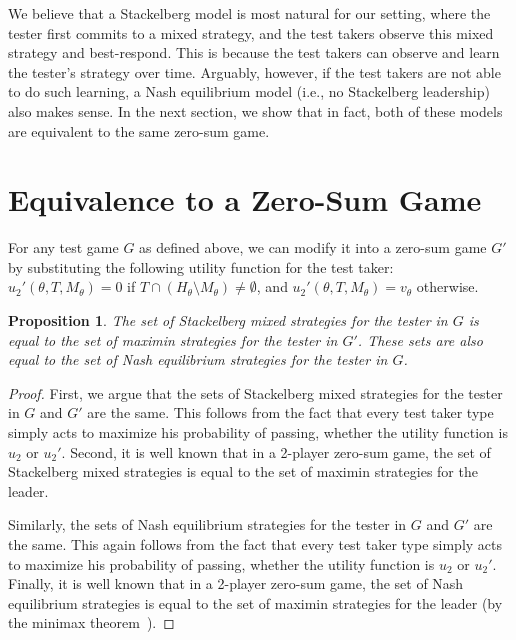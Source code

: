 \documentclass{article}
\newtheorem{proposition}{Proposition}
\begin{document}


We believe that a Stackelberg model is most natural for our setting, where
the tester first commits to a mixed strategy, and the test takers observe
this mixed strategy and best-respond.  This is because the test takers can
observe and learn the tester's strategy over time.  Arguably, however, if
the test takers are not able to do such learning, a Nash equilibrium model
(i.e., no Stackelberg leadership) also makes sense.  In the next section,
we show that in fact, both of these models are equivalent to the same
zero-sum game.





\section{Equivalence to a Zero-Sum Game}

For any test game $G$ as defined above, we can modify it into a zero-sum
game $G'$ by substituting the following utility function for the test
taker: $u_2'(\theta, T, M_\theta) = 0$ if $T \cap (H_\theta \setminus
M_\theta) \neq \emptyset$, and $u_2'(\theta, T, M_\theta) = v_\theta$
otherwise.

\begin{proposition}
  The set of Stackelberg mixed strategies for the tester in $G$ is equal to
  the set of maximin strategies for the tester in $G'$.  These sets are
  also equal to the set of Nash equilibrium strategies for the tester in
  $G$.
\label{prop:equivalence}
\end{proposition}
\begin{proof}
First, we argue that the sets of Stackelberg mixed strategies for the
tester in $G$ and $G'$ are the same.  This follows from the fact that every
test taker type simply acts to maximize his probability of passing, whether
the utility function is $u_2$ or $u_2'$.  Second, it is well known that in
a 2-player zero-sum game, the set of Stackelberg mixed strategies is equal
to the set of maximin strategies for the leader.

Similarly, the sets of Nash equilibrium strategies for the
tester in $G$ and $G'$ are the same.  This again follows from the fact that every
test taker type simply acts to maximize his probability of passing, whether
the utility function is $u_2$ or $u_2'$.  Finally, it is well known that in
a 2-player zero-sum game, the set of Nash equilibrium strategies is equal
to the set of maximin strategies for the leader (by the minimax theorem~\cite{Neumann28:Zur}).
\end{proof}
\end{document}
